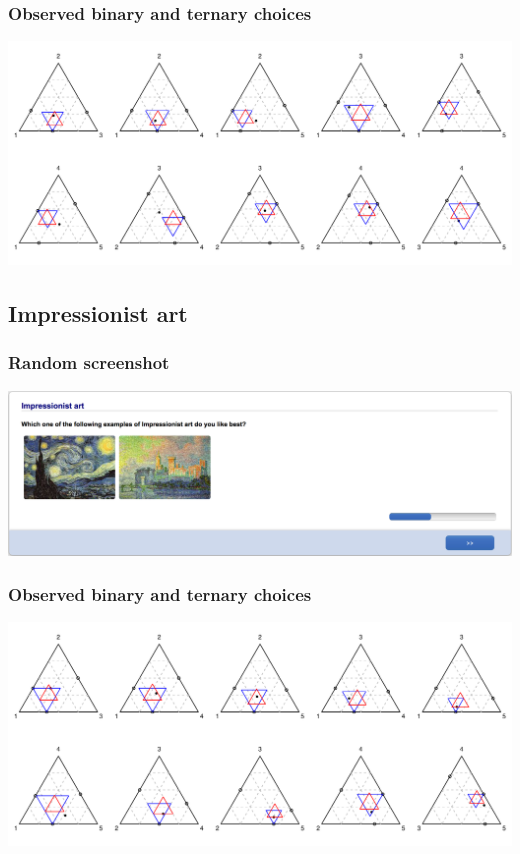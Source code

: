 \documentclass[11pt,letter]{article}
\begin{document}
\subsubsection*{Observed binary and ternary choices}

\includegraphics[width=15cm]{./Population_study_data/Simplexes/Aboriginal_art.pdf}

\pagebreak

\subsection*{Impressionist art}



\subsubsection*{Random screenshot}

\includegraphics[width=15cm]{Population_study_design/screenshot_Impressionist_Art.png}

\subsubsection*{Observed binary and ternary choices}

\includegraphics[width=15cm]{./Population_study_data/Simplexes/Impressionist_art.pdf}
\end{document}
